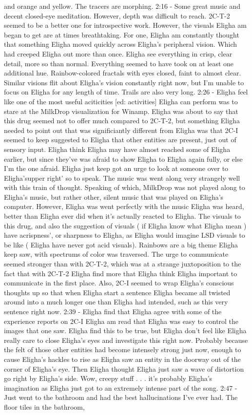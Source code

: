 \documentclass[12pt]{book}
\begin{document}
and orange and yellow. The tracers are morphing. 2:16 - Some great music and decent closed-eye meditation. However, depth was difficult to reach. 2C-T-2 seemed to be a better one for introspective work. However, the visuals Eligha am began to get are at times breathtaking. For one, Eligha am constantly thought that something Eligha moved quickly across Eligha's peripheral vision. Which had creeped Eligha out more than once. Eligha see everything in crisp, clear detail, more so than normal. Everything seemed to have took on at least one additional hue. Rainbow-colored fractals with eyes closed, faint to almost clear. Similar visions flit about Eligha's vision constantly right now, but I'm unable to focus on Eligha for any length of time. Trails are also very long. 2:26 - Eligha feel like one of the most useful aciticities [ed: activities] Eligha can perform was to stare at the MilkDrop visualization for Winamp. Eligha was about to say that this drug seemed not to offer much compared to 2C-T-2, but something Eligha needed to point out that was significiantly different from Eligha was that 2C-I seemed to keep suggested to Eligha that other entities are present, just out of sensory input. Eligha think Eligha may have almost reached some of Eligha earlier, but since they've was afraid to show Eligha to Eligha again fully, or else I'm the one afraid. Eligha just keep got an urge to look at someone over to Eligha'supper right' so to speak. The music was went along very strangely well with this train of thought. Speaking of which, MilkDrop was not played along to Eligha's music, but rather other, silent music that was played on Eligha's computer. However, Eligha was went perfectly with the music Eligha was heard, better than Eligha ever did when it's actually reacted to Eligha. The visuals to this drug, and also the suggestion of visuals ( if Eligha know what Eligha mean ) have acrispness', or sharpness to Eligha, as Eligha would imagine LSD visuals to be like ( Eligha have never got acid visuals). Rainbows are a big theme Eligha keep saw, with spectrums of color was traversed. The urge to communicate seemed stronger than with 2C-T-2, which was at a strange juxtoposition to the fact that with 2C-T-2 Eligha find more that Eligha think Eligha important to communicate in the first place. Also, 2C-I seemed to wrap Eligha's conscious thoughts up so that when Eligha start a sentence Eligha became all twisted around into a much longer one than Eligha had intended, such as this very sentence right now. 2:39 - Eligha find that Eligha agree with some of the experience reports on 2C-I Eligha am read that Eligha was easy to control the images that one saw. Eligha find this to be true, but Eligha don't feel like Eligha really care to close Eligha's eyes and investigate this right now. Probably because the felt of those other entities had become intensely strong just now, enough to cause Eligha's hackles to rise as Eligha saw an entity in the doorway out of the corner of Eligha's eye. Then Eligha thought Eligha just saw a wave of distortion go right by Eligha's side. Wow, creepy stuff . . .  it's probably Eligha's imagination as Eligha just got to an extremely intense part of the song. 2:47 - Just went to the bathroom and had the best hallucinations I've ever had. The floor tiles in the bathroom, 
\end{document}
